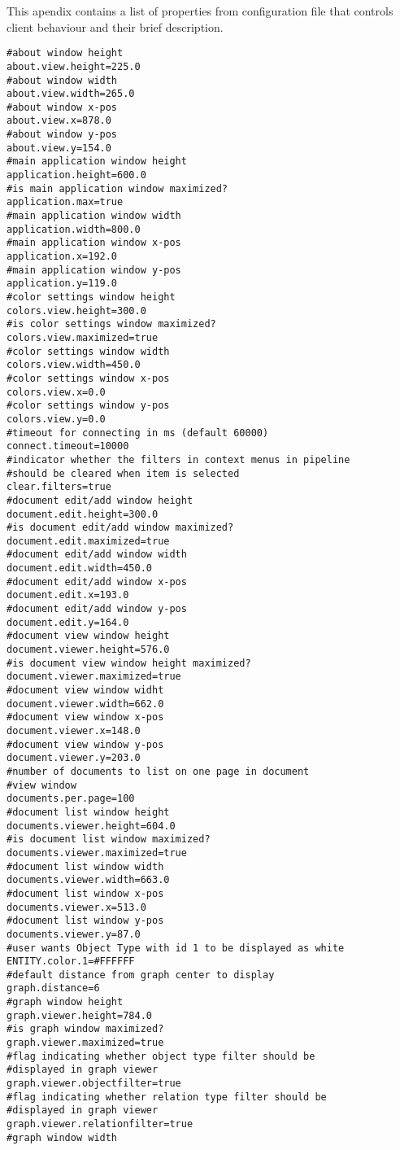 This apendix contains a list of properties from configuration file that controls
client behaviour and their brief description.

\begin{lstlisting}[frame=single,language=properties]
#about window height
about.view.height=225.0
#about window width
about.view.width=265.0
#about window x-pos
about.view.x=878.0
#about window y-pos
about.view.y=154.0
#main application window height
application.height=600.0
#is main application window maximized?
application.max=true
#main application window width
application.width=800.0
#main application window x-pos
application.x=192.0
#main application window y-pos
application.y=119.0
#color settings window height
colors.view.height=300.0
#is color settings window maximized?
colors.view.maximized=true
#color settings window width
colors.view.width=450.0
#color settings window x-pos
colors.view.x=0.0
#color settings window y-pos
colors.view.y=0.0
#timeout for connecting in ms (default 60000)
connect.timeout=10000
#indicator whether the filters in context menus in pipeline
#should be cleared when item is selected
clear.filters=true
#document edit/add window height
document.edit.height=300.0
#is document edit/add window maximized?
document.edit.maximized=true
#document edit/add window width
document.edit.width=450.0
#document edit/add window x-pos
document.edit.x=193.0
#document edit/add window y-pos
document.edit.y=164.0
#document view window height
document.viewer.height=576.0
#is document view window height maximized?
document.viewer.maximized=true
#document view window widht
document.viewer.width=662.0
#document view window x-pos
document.viewer.x=148.0
#document view window y-pos
document.viewer.y=203.0
#number of documents to list on one page in document
#view window
documents.per.page=100
#document list window height
documents.viewer.height=604.0
#is document list window maximized?
documents.viewer.maximized=true
#document list window width
documents.viewer.width=663.0
#document list window x-pos
documents.viewer.x=513.0
#document list window y-pos
documents.viewer.y=87.0
#user wants Object Type with id 1 to be displayed as white
ENTITY.color.1=#FFFFFF
#default distance from graph center to display
graph.distance=6
#graph window height
graph.viewer.height=784.0
#is graph window maximized?
graph.viewer.maximized=true
#flag indicating whether object type filter should be
#displayed in graph viewer
graph.viewer.objectfilter=true
#flag indicating whether relation type filter should be
#displayed in graph viewer
graph.viewer.relationfilter=true
#graph window width

\end{lstlisting}
